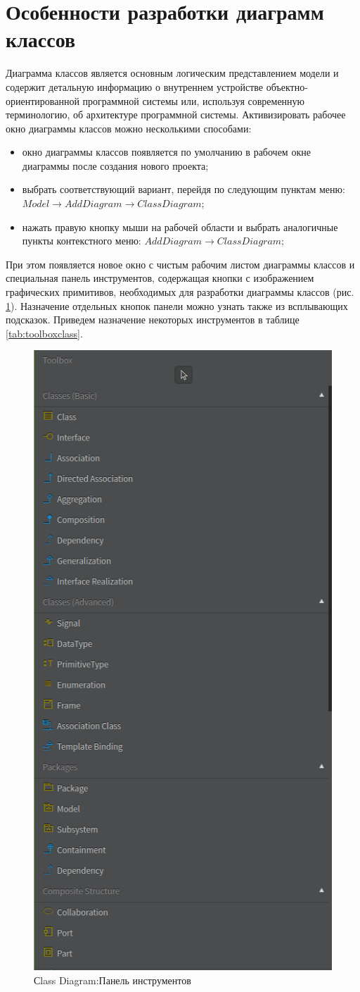 \documentclass[a4paper,12pt]{extreport}
\begin{document}
\section{Особенности разработки диаграмм классов}
Диаграмма классов является основным логическим представлением модели и содержит детальную информацию о внутреннем устройстве объектно-ориентированной программной системы или, используя современную терминологию, об архитектуре программной системы. Активизировать рабочее окно диаграммы классов можно несколькими способами:
\begin{itemize}
	\item окно диаграммы классов появляется по умолчанию в рабочем окне диаграммы после создания нового проекта;
	\item выбрать соответствующий вариант, перейдя по следующим пунктам меню: \\$Model \to Add Diagram \to Class Diagram$;
	\item нажать правую кнопку мыши на рабочей области и выбрать аналогичные пункты контекстного меню: $Add Diagram \to Class Diagram$;
\end{itemize}

При этом появляется новое окно с чистым рабочим листом диаграммы классов и специальная панель инструментов, содержащая кнопки с изображением графических примитивов, необходимых для разработки диаграммы классов (рис. \ref{fig:toolboxclass}). Назначение отдельных кнопок панели можно узнать также из всплывающих подсказок. Приведем назначение некоторых инструментов в таблице \ref{tab:toolboxclass}.

\begin{figure}[h!]
	\centering
	\includegraphics[width=0.4\linewidth]{images/toolboxclass}
	\caption{Сlass Diagram:Панель инструментов}
	\label{fig:toolboxclass}
\end{figure}
\end{document}
